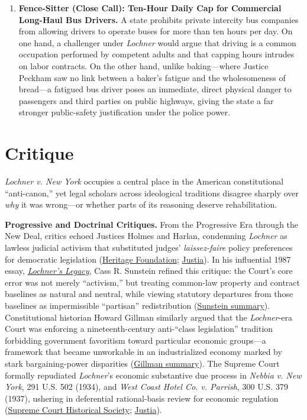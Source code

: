 \documentclass[12pt]{article}
\begin{document}
\begin{enumerate}
    \item \textbf{Fence-Sitter (Close Call): Ten-Hour Daily Cap for Commercial Long-Haul Bus Drivers.} A state prohibits private intercity bus companies from allowing drivers to operate buses for more than ten hours per day. On one hand, a challenger under \textit{Lochner} would argue that driving is a common occupation performed by competent adults and that capping hours intrudes on labor contracts. On the other hand, unlike baking---where Justice Peckham saw no link between a baker's fatigue and the wholesomeness of bread---a fatigued bus driver poses an immediate, direct physical danger to passengers and third parties on public highways, giving the state a far stronger public-safety justification under the police power.
\end{enumerate}

\section{Critique}

\textit{Lochner v. New York} occupies a central place in the American constitutional ``anti-canon,'' yet legal scholars across ideological traditions disagree sharply over \textit{why} it was wrong---or whether parts of its reasoning deserve rehabilitation.

\textbf{Progressive and Doctrinal Critiques.} From the Progressive Era through the New Deal, critics echoed Justices Holmes and Harlan, condemning \textit{Lochner} as lawless judicial activism that substituted judges' \textit{laissez-faire} policy preferences for democratic legislation (\href{https://www.heritage.org/the-constitution/report/economic-liberty-and-the-constitution-introduction}{Heritage Foundation}; \href{https://supreme.justia.com/cases/federal/us/198/45/}{Justia}). In his influential 1987 essay, \href{https://chicagounbound.uchicago.edu/journal_articles/8453/}{\textit{Lochner's Legacy}}, Cass R. Sunstein refined this critique: the Court's core error was not merely ``activism,'' but treating common-law property and contract baselines as natural and neutral, while viewing statutory departures from those baselines as impermissible ``partisan'' redistribution (\href{https://en.wikipedia.org/wiki/Lochner_era}{Sunstein summary}). Constitutional historian Howard Gillman similarly argued that the \textit{Lochner}-era Court was enforcing a nineteenth-century anti-``class legislation'' tradition forbidding government favoritism toward particular economic groups---a framework that became unworkable in an industrialized economy marked by stark bargaining-power disparities (\href{https://en.wikipedia.org/wiki/Lochner_era}{Gillman summary}). The Supreme Court formally repudiated \textit{Lochner}'s economic substantive due process in \textit{Nebbia v. New York}, 291 U.S. 502 (1934), and \textit{West Coast Hotel Co. v. Parrish}, 300 U.S. 379 (1937), ushering in deferential rational-basis review for economic regulation (\href{https://civics.supremecourthistory.org/article/lochner-v-new-york/}{Supreme Court Historical Society}; \href{https://supreme.justia.com/cases/federal/us/198/45/}{Justia}).
\end{document}
